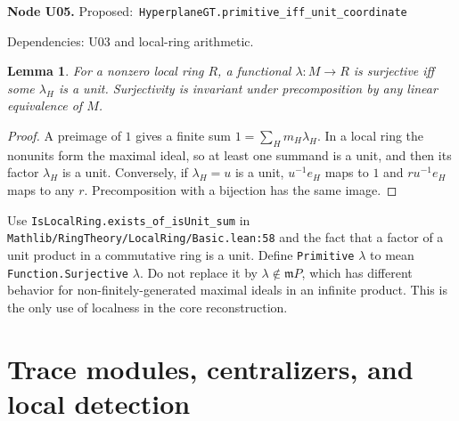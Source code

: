 \documentclass[11pt]{article}
\newtheorem{lemma}[theorem]{Lemma}
\theoremstyle{remark}\newtheorem{remark}[theorem]{Remark}
\newcommand{\code}[1]{\nolinkurl{#1}}
\newcommand{\node}[3]{\par\Needspace{8\baselineskip}\smallskip\noindent\textbf{Node #1.}\quad
 \textsf{Proposed:}\ \code{#2}\par\noindent
 \textsf{Dependencies:} #3.\par\smallskip}
\begin{document}
\node{U05}{HyperplaneGT.primitive_iff_unit_coordinate}{U03 and local-ring arithmetic}
\begin{lemma}\label{lem:u05}
For a nonzero local ring $R$, a functional $\lambda:M\to R$ is
surjective iff some $\lambda_H$ is a unit. Surjectivity is invariant
under precomposition by any linear equivalence of $M$.
\end{lemma}
\begin{proof}
A preimage of $1$ gives a finite sum
$1=\sum_Hm_H\lambda_H$. In a local ring the nonunits form the
maximal ideal, so at least one summand is a unit, and then its
factor $\lambda_H$ is a unit. Conversely, if $\lambda_H=u$ is a
unit, $u^{-1}e_H$ maps to $1$ and $ru^{-1}e_H$ maps to any $r$.
Precomposition with a bijection has the same image.
\end{proof}
Use \code{IsLocalRing.exists_of_isUnit_sum} in
\code{Mathlib/RingTheory/LocalRing/Basic.lean:58} and the fact that
a factor of a unit product in a commutative ring is a unit. Define
\texttt{Primitive} $\lambda$ to mean \texttt{Function.Surjective} $\lambda$. Do not
replace it by $\lambda\notin\mathfrak mP$, which has different
behavior for non-finitely-generated maximal ideals in an infinite
product. This is the only use of localness in the core reconstruction.

\section{Trace modules, centralizers, and local detection}
\label{sec:local}
\end{document}
